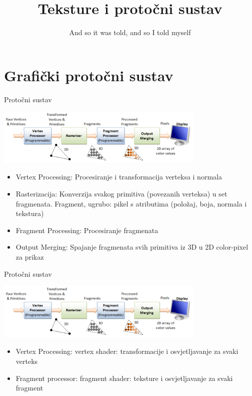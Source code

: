 \documentclass[9pt]{beamer}
\title{Teksture i protočni sustav}
\subtitle {And so it was told, and so I told myself}
\institute{Računalna grafika}
\begin{document}
\begin{frame}
 \titlepage
\end{frame}

\section{Grafički protočni sustav}
\begin{frame}{Protočni sustav}
	\begin{center}
		\includegraphics[width=10cm]{./slike/graphics_pipeline_01.png}
	\end{center}
\begin{itemize}
	\item Vertex Processing: Procesiranje i transformacija verteksa i normala
	\item Rasterizacija: Konverzija svakog primitiva (povezanih verteksa) u set fragmenata. Fragment, ugrubo: pikel s atributima (položaj, boja, normala i tekstura)
	\item Fragment Processing: Procesiranje fragmenata
	\item Output Merging: Spajanje fragmenata svih primitiva iz 3D u 2D color-pixel za prikaz
\end{itemize}
\end{frame}


\begin{frame}{Protočni sustav}
	\begin{center}
		\includegraphics[width=10cm]{./slike/graphics_pipeline_01.png}
	\end{center}
	\begin{itemize}
		\item Vertex Processing: vertex shader: transformacije i osvjetljavanje za svaki verteks
		\item Fragment processor: fragment shader: teksture i osvjetljavanje za svaki fragment
	\end{itemize}
\end{frame}
\end{document}
